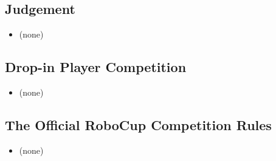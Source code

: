 \documentclass[12pt]{article}
\begin{document}
\subsection*{Judgement}
\begin{itemize}
	\item (none)
\end{itemize}

\subsection*{Drop-in Player Competition}
\begin{itemize}	
	\item (none)
\end{itemize}

\subsection*{The Official RoboCup Competition Rules}
\begin{itemize}	
	\item (none)
\end{itemize}
\end{document}
